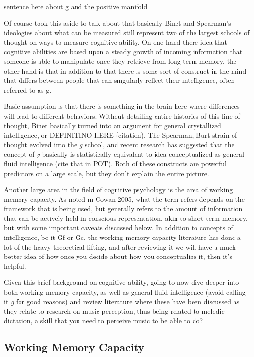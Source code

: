 \documentclass[]{book}
\theoremstyle{definition}
\theoremstyle{definition}
\theoremstyle{definition}
\theoremstyle{remark}
\begin{document}
sentence here about g and the positive manifold

Of course took this aside to talk about that basically Binet and
Spearman's ideologies about what can be measured still represent two of
the largest schools of thought on ways to measure cognitive ability. On
one hand there idea that cognitive abilities are based upon a steady
growth of incoming information that someone is able to manipulate once
they retrieve from long term memory, the other hand is that in addition
to that there is some sort of construct in the mind that differs between
people that can singularly reflect their intelligence, often referred to
as g.

Basic assumption is that there is something in the brain here where
differences will lead to different behaviors. Without detailing entire
histories of this line of thought, Binet basically turned into an
argument for general crystallized intelligence, or DEFINITINO HERE
(citation). The Spearman, Burt strain of thought evolved into the
\emph{g} school, and recent research has suggested that the concept of
\emph{g} basically is statistically equivalent to idea conceptualized as
general fluid intelligence (cite that in POT). Both of these constructs
are powerful predictors on a large scale, but they don't explain the
entire picture.

Another large area in the field of cognitive psychology is the area of
working memory capacity. As noted in Cowan 2005, what the term refers
depends on the framework that is being used, but generally refers to the
amount of information that can be actively held in conscious
representation, akin to short term memory, but with some important
caveats discussed below. In addition to concepts of intelligence, be it
Gf or Gc, the working memory capacity literature has done a lot of the
heavy theoretical lifting, and after reviewing it we will have a much
better idea of how once you decide about how you conceptualize it, then
it's helpful.

Given this brief background on cognitive ability, going to now dive
deeper into both working memory capacity, as well as general fluid
intelligence (avoid calling it \emph{g} for good reasons) and review
literature where these have been discussed as they relate to research on
music perception, thus being related to melodic dictation, a skill that
you need to perceive music to be able to do?

\hypertarget{working-memory-capacity}{%
\subsection{Working Memory Capacity}\label{working-memory-capacity}}
\end{document}
